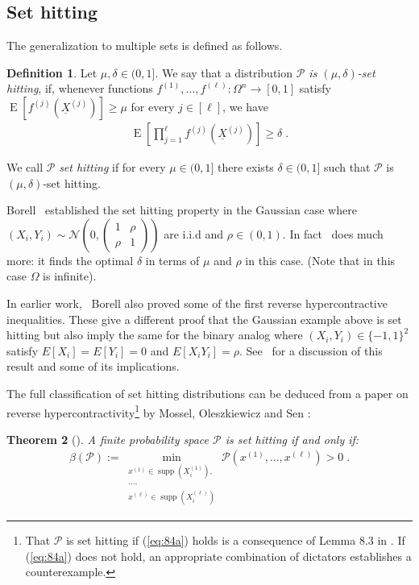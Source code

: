 \documentclass{daj}
\newcommand{\1}{\mathbbm{1}}
\theoremstyle{plain}
\newtheorem{theorem}{Theorem}[section]
\theoremstyle{definition}
\newtheorem{definition}[theorem]{Definition}
\DeclareMathOperator*{\EE}{E}
\DeclareMathOperator*{\supp}{supp}
\newcommand{\cP}{\mathcal{P}}
\begin{document}
\subsection{Set hitting} 
The generalization to multiple sets is defined as follows. 
\begin{definition}
\label{def:hitting}
Let $\mu, \delta \in (0, 1]$. We say that a distribution
\emph{$\mathcal{P}$ is $(\mu, \delta)$-set hitting},
if, whenever functions $f^{(1)}, \ldots, f^{(\ell)}: \Omega^n \to [0, 1]$ satisfy
$\EE[f^{(j)}(\underline{X}^{(j)})] \allowbreak \ge \mu$
for every $j \in [\ell]$,
we have
\begin{align}
\label{eq:85a}
\EE \left[ \prod_{j=1}^\ell f^{(j)}(\underline{X}^{(j)})\right]
  \ge \delta \; .
\end{align}

We call $\mathcal{P}$ \emph{set hitting} if for every 
$\mu \in (0, 1]$ there exists $\delta \in (0, 1]$ such that
$\mathcal{P}$ is $(\mu, \delta)$-set hitting.
\end{definition}

Borell~\cite{Bor85} established the set hitting property in the Gaussian case where 
$(X_i,Y_i) \sim \mathcal{N}(0,\left( \begin{matrix} 1 & \rho \\ \rho & 1 \end{matrix} \right))$ are i.i.d and 
$\rho \in (0,1)$. 
In fact~\cite{Bor85} does much more: it finds the optimal $\delta$ in terms of $\mu$ and $\rho$ in this case. 
(Note that in this case $\Omega$ is infinite). 

In earlier work,~\cite{Bor82} Borell also proved some of the first
reverse hypercontractive inequalities. 
 These give a different proof that the Gaussian example above is set hitting but also imply 
  the same for the binary analog where 
$(X_i,Y_i) \in \{-1,1\}^2$ satisfy $E[X_i] = E[Y_i] = 0$ and $E[X_i Y_i] = \rho$.
See~\cite{MOR06} for a discussion of this result and some of its implications.   

The full classification of set hitting distributions can be deduced from
a paper on reverse hypercontractivity\footnote{
That $\mathcal{P}$ is set hitting if (\ref{eq:84a}) holds is a consequence
of Lemma 8.3 in \cite{MOS13}. If (\ref{eq:84a}) does not hold,
an appropriate combination of dictators establishes a counterexample.  
}
by Mossel, Oleszkiewicz and Sen
\cite{MOS13}:
\begin{theorem}[\cite{MOS13}]
\label{thm:different-sets-classification}
A finite probability space $\mathcal{P}$ is set hitting if and only if:
\begin{align}
\label{eq:84a}
  \beta(\cP) :=
  \min_{\substack{x^{(1)} \in \supp(X_i^{(1)}),\\
  \ldots,\\
  x^{(\ell)} \in \supp(X_i^{(\ell)})}}
  \mathcal{P}(x^{(1)}, \ldots, x^{(\ell)}) > 0 \; .
\end{align}
\end{theorem}
\end{document}

